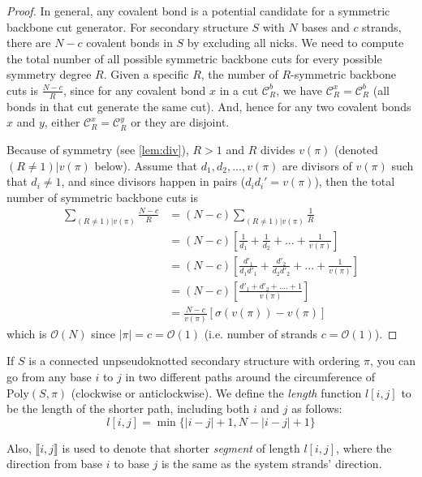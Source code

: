 \documentclass[11pt,letterpaper]{article}  \usepackage[margin=1in]{geometry}
\theoremstyle{definition}  \newtheorem{Definition}[theorem]{Definition}
\newcommand{\PolySpi}{\ensuremath{\mathrm{Poly}(S,\pi)}\xspace}
\begin{document}
\begin{proof}
	In general, any covalent bond is a potential candidate for a symmetric backbone cut generator. For secondary structure $S$ with $N$ bases and $c$ strands, there are $N-c$ covalent bonds  in $S$ by excluding all nicks.  
	We need to compute the total number of all possible  symmetric backbone cuts for every possible symmetry degree $R$. 
	Given a specific $R$, the number of    $R$-symmetric backbone cuts is $\frac{N-c}{R}$, 
	since for any covalent bond $x$ in a cut $\mathcal{C}_R^b$, we have $\mathcal{C}_R^x = \mathcal{C}_R^b$ (all bonds in that cut generate the same cut). 
	And, hence for any two covalent bonds $x$ and $y$, either $\mathcal{C}_R^x = \mathcal{C}_R^y$ or they are disjoint.   
	
	Because of symmetry (see \cref{lem:div}),  $R>1$ and $R$ divides $v(\pi)$ (denoted $(R\neq1)|v(\pi)$ below). 
	Assume that $d_1, d_2, ..., v(\pi)$ are divisors of $v(\pi)$ such that $d_i \neq 1$, 
	and since divisors happen in pairs ($d_i d_i' = v(\pi)$), 
	then the total number of symmetric backbone cuts is 	\begin{align*}
		\sum\limits_{(R\neq1)|v(\pi)}\frac{N-c}{R} &= 
		(N-c) \sum\limits_{(R\neq1)|v(\pi)}\frac{1}{R} \\
		&= (N-c) \left[ \frac{1}{d_1} + \frac{1}{d_2} + ... + \frac{1}{v(\pi)} \right] 
		\\
		&= (N-c) \left[ \frac{d'_1}{d_1d'_1} + \frac{d'_2}{d_2d'_2} + ... + \frac{1}{v(\pi)} \right] \\
		&= (N-c) \left[ \frac{d'_1 + d'_2 + .... + 1}{v(\pi)}\right]
		\\ 
		&=\frac{N-c}{v(\pi)} \left[ \sigma(v(\pi))-v(\pi) \right]
	\end{align*}
	which is $\mathcal{O}(N)$ since $|\pi|=c=\mathcal{O}(1)$ (i.e. number of strands $c=\mathcal{O}(1)$).
\end{proof}


If $S$ is a connected unpseudoknotted secondary structure with ordering $\pi$, you can go from any base $i$ to $j$ in two different paths around the circumference of $\PolySpi$ (clockwise or anticlockwise). We define the \emph{length} function $l[i,j]$ to be the length of the shorter path, including both $i$ and $j$ as follows: 
\begin{equation}
	l[i,j] = \min \{|i-j|+1,N-|i-j|+1\}
\end{equation} 

Also,  $\llbracket i,j \rrbracket$  is used to denote that shorter {\em segment} of length $l[i,j]$, where the direction from base $i$ to base $j$ is the same as the system strands' direction.    
\end{document}
